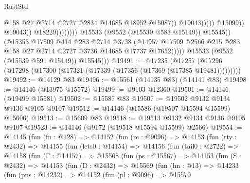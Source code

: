 \begin{lexlean}{RustStd}
\begin{coremodule}
                                                          @158
                                                          @27
                                                          @2714
                                                          @2727
                                                          @2834
                                                          @14685
                                                          @18952
                                                          @15087))
                                                      @19043)))))
                                            @15099))
                                        @19043))
                                    @18229))))))))
                    @15533
                    (@9552 (@15539 @583 @15149))
                    @15545))
                (@15353
                  @17509
                  @414
                  @283
                  @2714
                  @3738
                  (@14957
                    @17509
                    @2566
                    @215
                    @283
                    @158
                    @27
                    @2714
                    @2727
                    @3736
                    @14685
                    @17737
                    @17652)))))
          @15533
          (@9552 (@15539 @591 @15149))
          @15545)))
@19491 := @17235
    (@17257 (@17296 (@17298 (@17300 (@17321 (@17339 (@17356 (@17369 (@17385 @19481)))))))))
@19492 := @14129 @83
@19496 := @15561 (@14135 @83) (@14141 @83)
@19498 := @14146 (@13975 @15572)
@19499 := @9103 @12360
@19501 := @14146 (@19499 @15581)
@19502 := @15587 @83
@19507 := @19502 @9132 @9134 @9136 @9105 @9107
@19512 := @14146 (@15586 (@19507 @15594 @15599) @15606)
@19513 := @15609 @83
@19518 := @19513 @9132 @9134 @9136 @9105 @9107
@19523 := @14146 (@9172 (@19518 @15594 @15599) @2566)
@19554 := @14145
    (fun (fn : @128) =>
    @14152
      (fun (rc : @9096) =>
      @14153
        (fun (rty : @2432) =>
        @14155
          (fun (lets0 : @14154) =>
          @14156
            (fun (tail0 : @2722) =>
            @14158
              (fun (Γ : @14157) =>
              @15568
                (fun (ps : @15567) =>
                @14153
                  (fun (S : @2432) =>
                  @14153
                    (fun (D : @2432) =>
                    @15569
                      (fun (hn : @13) =>
                      @14233
                        (fun (pns : @14232) =>
                        @14152
                          (fun (pl : @9096) =>
                          @15570

\end{coremodule}
\end{lexlean}
